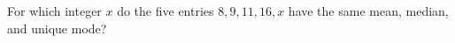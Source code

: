 For which integer $x$ do the five entries $8,9,11,16,x$ have the same mean, median, and unique mode?
